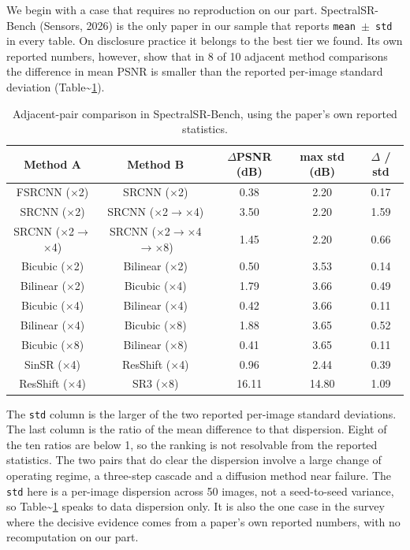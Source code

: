\documentclass{interact}
\newlength{\tblavail}
\begin{document}
We begin with a case that requires no reproduction on our part. SpectralSR-Bench (Sensors, 2026) is the only paper in our sample that reports \texttt{mean $\pm$ std} in every table. On disclosure practice it belongs to the best tier we found. Its own reported numbers, however, show that in 8 of 10 adjacent method comparisons the difference in mean PSNR is smaller than the reported per-image standard deviation (Table\textasciitilde{}\ref{tab:srbench}).

\begin{table}[tbp]
\centering
\footnotesize
\setlength{\tabcolsep}{3pt}
\setlength{\tblavail}{\dimexpr\textwidth-10\tabcolsep\relax}
\begin{tabular}{ccccc}
\hline
Method A & Method B & $\Delta$PSNR (dB) & max std (dB) & $\Delta$ / std \\
\hline
FSRCNN ($\times$2) & SRCNN ($\times$2) & 0.38 & 2.20 & 0.17 \\
SRCNN ($\times$2) & SRCNN ($\times$2$\rightarrow$$\times$4) & 3.50 & 2.20 & 1.59 \\
SRCNN ($\times$2$\rightarrow$$\times$4) & SRCNN ($\times$2$\rightarrow$$\times$4$\rightarrow$$\times$8) & 1.45 & 2.20 & 0.66 \\
Bicubic ($\times$2) & Bilinear ($\times$2) & 0.50 & 3.53 & 0.14 \\
Bilinear ($\times$2) & Bicubic ($\times$4) & 1.79 & 3.66 & 0.49 \\
Bicubic ($\times$4) & Bilinear ($\times$4) & 0.42 & 3.66 & 0.11 \\
Bilinear ($\times$4) & Bicubic ($\times$8) & 1.88 & 3.65 & 0.52 \\
Bicubic ($\times$8) & Bilinear ($\times$8) & 0.41 & 3.65 & 0.11 \\
SinSR ($\times$4) & ResShift ($\times$4) & 0.96 & 2.44 & 0.39 \\
ResShift ($\times$4) & SR3 ($\times$8) & 16.11 & 14.80 & 1.09 \\
\hline
\end{tabular}
\caption{Adjacent-pair comparison in SpectralSR-Bench, using the paper's own reported statistics.}\label{tab:srbench}
\end{table}

The \texttt{std} column is the larger of the two reported per-image standard deviations. The last column is the ratio of the mean difference to that dispersion. Eight of the ten ratios are below 1, so the ranking is not resolvable from the reported statistics. The two pairs that do clear the dispersion involve a large change of operating regime, a three-step cascade and a diffusion method near failure. The \texttt{std} here is a per-image dispersion across 50 images, not a seed-to-seed variance, so Table\textasciitilde{}\ref{tab:srbench} speaks to data dispersion only. It is also the one case in the survey where the decisive evidence comes from a paper's own reported numbers, with no recomputation on our part.
\end{document}
